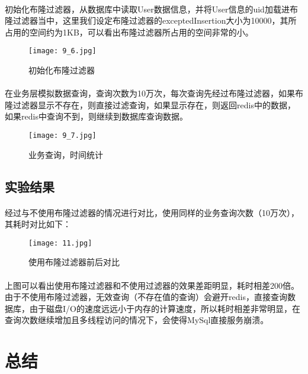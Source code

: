 \documentclass[lang=cn,11pt,a4paper,cite=numbers]{elegantpaper}
\begin{document}
\paragraph{}初始化布隆过滤器，从数据库中读取User数据信息，并将User信息的uid加载进布隆过滤器当中，这里我们设定布隆过滤器的exceptedInsertion大小为10000，其所占用的空间约为1KB，可以看出布隆过滤器所占用的空间非常的小。
\begin{figure}[!htb]
    \centering
    \texttt{[image: 9\_6.jpg]}
    \caption{初始化布隆过滤器}
\end{figure}

\paragraph{}在业务层模拟数据查询，查询次数为10万次，每次查询先经过布隆过滤器，如果布隆过滤器显示不存在，则直接过滤查询，如果显示存在，则返回redis中的数据，如果redis中查询不到，则继续到数据库查询数据。
\begin{figure}[!htb]
    \centering
    \texttt{[image: 9\_7.jpg]}
    \caption{业务查询，时间统计}
\end{figure}

\subsection{实验结果}
\paragraph{}经过与不使用布隆过滤器的情况进行对比，使用同样的业务查询次数（10万次），其耗时对比如下：
\begin{figure}[!htb]
    \centering
    \texttt{[image: 11.jpg]}
    \caption{使用布隆过滤器前后对比}
\end{figure}
\paragraph{}上图可以看出使用布隆过滤器和不使用过滤器的效果差距明显，耗时相差200倍。由于不使用布隆过滤器，无效查询（不存在值的查询）会避开redis，直接查询数据库，由于磁盘I/O的速度远远小于内存的计算速度，所以耗时相差非常明显，在查询次数继续增加且多线程访问的情况下，会使得MySql直接服务崩溃。
\section{总结}
\end{document}
